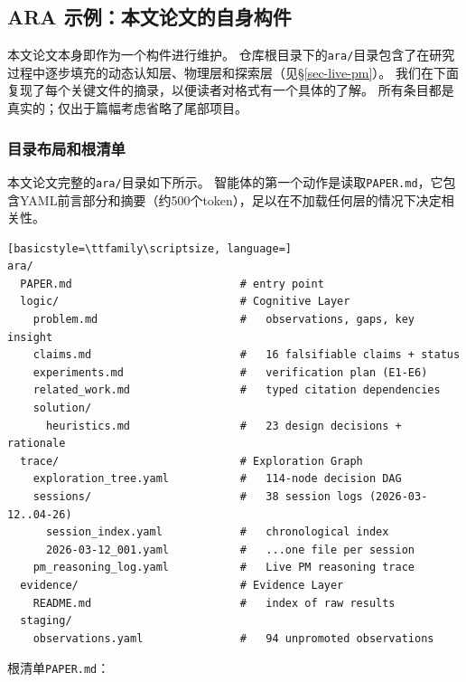 \subsection{ARA 示例：本文论文的自身构件}
\label{sec-schema}

本文论文本身即作为一个\ara{}构件进行维护。
仓库根目录下的\texttt{ara/}目录包含了在研究过程中逐步填充的动态认知层、物理层和探索层（见\S\ref{sec-live-pm}）。
我们在下面复现了每个关键文件的摘录，以便读者对格式有一个具体的了解。
所有条目都是真实的；仅出于篇幅考虑省略了尾部项目。

\subsubsection{目录布局和根清单}

本文论文完整的\texttt{ara/}目录如下所示。
智能体的第一个动作是读取\texttt{PAPER.md}，它包含YAML前言部分和摘要（约500个token），足以在不加载任何层的情况下决定相关性。

\begin{lstlisting}[basicstyle=\ttfamily\scriptsize, language=]
ara/
  PAPER.md                          # entry point
  logic/                            # Cognitive Layer
    problem.md                      #   observations, gaps, key insight
    claims.md                       #   16 falsifiable claims + status
    experiments.md                  #   verification plan (E1-E6)
    related_work.md                 #   typed citation dependencies
    solution/
      heuristics.md                 #   23 design decisions + rationale
  trace/                            # Exploration Graph
    exploration_tree.yaml           #   114-node decision DAG
    sessions/                       #   38 session logs (2026-03-12..04-26)
      session_index.yaml            #   chronological index
      2026-03-12_001.yaml           #   ...one file per session
    pm_reasoning_log.yaml           #   Live PM reasoning trace
  evidence/                         # Evidence Layer
    README.md                       #   index of raw results
  staging/
    observations.yaml               #   94 unpromoted observations
\end{lstlisting}

\noindent 根清单\texttt{PAPER.md}：

